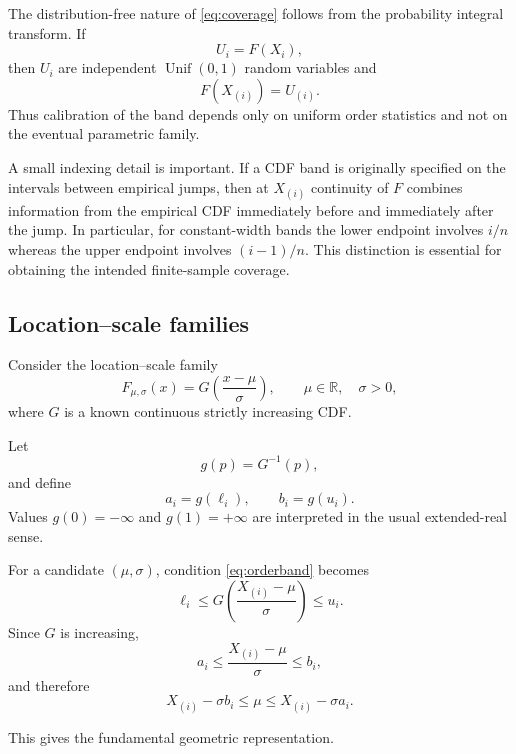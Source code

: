 \documentclass[11pt]{article}
\newcommand{\R}{\mathbb{R}}
\begin{document}
The distribution-free nature of \eqref{eq:coverage} follows from the
probability integral transform.  If
\[
    U_i=F(X_i),
\]
then $U_i$ are independent $\operatorname{Unif}(0,1)$ random variables
and
\[
    F(X_{(i)})=U_{(i)}.
\]
Thus calibration of the band depends only on uniform order statistics
and not on the eventual parametric family.

A small indexing detail is important.  If a CDF band is originally
specified on the intervals between empirical jumps, then at
$X_{(i)}$ continuity of $F$ combines information from the empirical
CDF immediately before and immediately after the jump.  In particular,
for constant-width bands the lower endpoint involves $i/n$ whereas the
upper endpoint involves $(i-1)/n$.  This distinction is essential for
obtaining the intended finite-sample coverage.


\subsection{Location--scale families}

Consider the location--scale family
\begin{equation}
    F_{\mu,\sigma}(x)
    =
    G\!\left(
        \frac{x-\mu}{\sigma}
    \right),
    \qquad
    \mu\in\R,\quad
    \sigma>0,
    \label{eq:lsfamily}
\end{equation}
where $G$ is a known continuous strictly increasing CDF.

Let
\[
    g(p)=G^{-1}(p),
\]
and define
\begin{equation}
    a_i=g(\ell_i),
    \qquad
    b_i=g(u_i).
    \label{eq:ab}
\end{equation}
Values $g(0)=-\infty$ and $g(1)=+\infty$ are interpreted in the usual
extended-real sense.

For a candidate $(\mu,\sigma)$, condition \eqref{eq:orderband} becomes
\[
    \ell_i
    \leq
    G\!\left(
        \frac{X_{(i)}-\mu}{\sigma}
    \right)
    \leq
    u_i.
\]
Since $G$ is increasing,
\[
    a_i
    \leq
    \frac{X_{(i)}-\mu}{\sigma}
    \leq
    b_i,
\]
and therefore
\begin{equation}
    X_{(i)}-\sigma b_i
    \leq
    \mu
    \leq
    X_{(i)}-\sigma a_i.
    \label{eq:linearconstraints}
\end{equation}

This gives the fundamental geometric representation.
\end{document}
